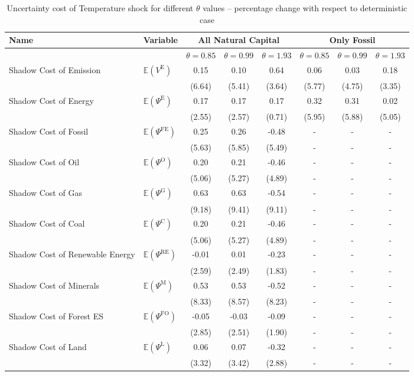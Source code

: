 \begin{table}[h!]
\centering
\begin{tabular}{l l c c c c c c}
\hline
Name & Variable & \multicolumn{3}{c}{All Natural Capital} & \multicolumn{3}{c}{Only Fossil} \\
\hline
 & & $\theta = 0.85$ & $\theta = 0.99$ & $\theta = 1.93$ & $\theta = 0.85$ & $\theta = 0.99$ & $\theta = 1.93$\\
\hline
Shadow Cost of Emission & $\mathbb{E}\!\left(V^{\text{E}}\right)$ & 0.15 & 0.10 & 0.64 & 0.06 & 0.03 & 0.18 \\
 & & (6.64) & (5.41) & (3.64) & (5.77) & (4.75) & (3.35) \\
Shadow Cost of Energy & $\mathbb{E}\!\left(\Psi^{\text{E}}\right)$ & 0.17 & 0.17 & 0.17 & 0.32 & 0.31 & 0.02 \\
 & & (2.55) & (2.57) & (0.71) & (5.95) & (5.88) & (5.05) \\
Shadow Cost of Fossil & $\mathbb{E}\!\left(\Psi^{\text{FE}}\right)$ & 0.25 & 0.26 & -0.48 & - & - & - \\
 & & (5.63) & (5.85) & (5.49) & - & - & - \\
Shadow Cost of Oil & $\mathbb{E}\!\left(\Psi^{\text{O}}\right)$ & 0.20 & 0.21 & -0.46 & - & - & - \\
 & & (5.06) & (5.27) & (4.89) & - & - & - \\
Shadow Cost of Gas & $\mathbb{E}\!\left(\Psi^{\text{G}}\right)$ & 0.63 & 0.63 & -0.54 & - & - & - \\
 & & (9.18) & (9.41) & (9.11) & - & - & - \\
Shadow Cost of Coal & $\mathbb{E}\!\left(\Psi^{\text{C}}\right)$ & 0.20 & 0.21 & -0.46 & - & - & - \\
 & & (5.06) & (5.27) & (4.89) & - & - & - \\
Shadow Cost of Renewable Energy & $\mathbb{E}\!\left(\Psi^{\text{RE}}\right)$ & -0.01 & 0.01 & -0.23 & - & - & - \\
 & & (2.59) & (2.49) & (1.83) & - & - & - \\
Shadow Cost of Minerals & $\mathbb{E}\!\left(\Psi^{\text{M}}\right)$ & 0.53 & 0.53 & -0.52 & - & - & - \\
 & & (8.33) & (8.57) & (8.23) & - & - & - \\
Shadow Cost of Forest ES & $\mathbb{E}\!\left(\Psi^{\text{FO}}\right)$ & -0.05 & -0.03 & -0.09 & - & - & - \\
 & & (2.85) & (2.51) & (1.90) & - & - & - \\
Shadow Cost of Land & $\mathbb{E}\!\left(\Psi^{\text{L}}\right)$ & 0.06 & 0.07 & -0.32 & - & - & - \\
 & & (3.32) & (3.42) & (2.88) & - & - & - \\
\hline
\end{tabular}
\caption{Uncertainty cost of Temperature shock for different $\theta$ values -- percentage change with respect to deterministic case}
\label{tab:paper_table5}
\end{table}
